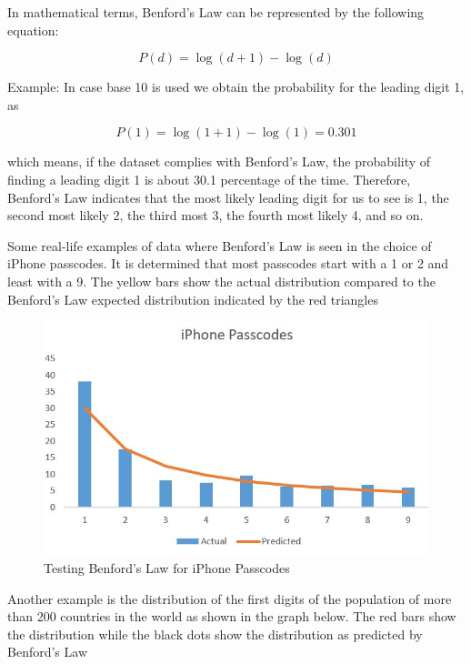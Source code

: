 In mathematical terms, Benford’s Law can be represented 
by the following equation:

\[P (d) = \log (d+1) - \log (d)\]

Example: In case base 10 is used we obtain the 
probability for the leading digit 1, as

\[P (1) = \log (1+1) - \log (1) = 0.301 \]

which means, if the dataset complies 
with Benford's Law, the probability of finding a 
leading digit 1 is about 30.1 percentage of the time. 
Therefore, Benford’s Law indicates that the most 
likely leading digit for us to see is 1, the second 
most likely 2, the third most 3, the fourth most 
likely 4, and so on.

Some real-life examples of data where Benford’s Law is 
seen in the choice of iPhone passcodes. 
It is determined that most passcodes start with a 1 or  
2 and least with a 9. The yellow bars show the actual
distribution compared to the Benford’s 
Law expected distribution indicated by the 
red triangles~\cite{hid-sp18-514-iphone-benford}

\begin{figure}[!ht]
\centering\includegraphics[width=\columnwidth]{images/iphone_benford.JPG}
  \caption{Testing Benford's Law for iPhone Passcodes}\label{f:iphone-pass_ben}
\end{figure}


Another example is the distribution of the first 
digits of the population of more than 200 countries 
in the world as shown in the graph below. 
The red bars show the distribution while 
the black dots show the distribution as 
predicted by Benford’s Law~\cite{hid-sp18-514-benfordwiki}

